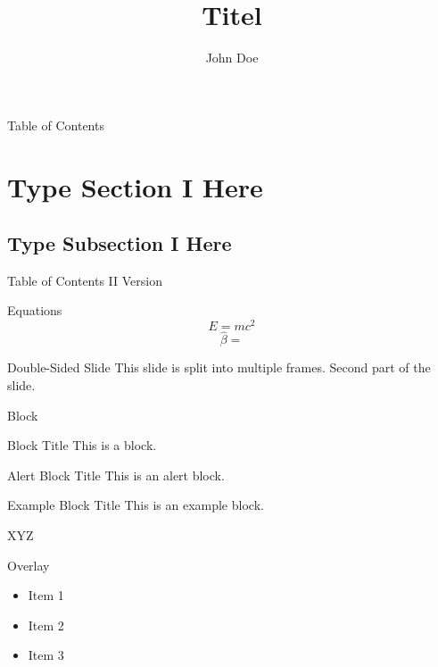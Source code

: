 \documentclass[11pt,aspectratio=169] {beamer}
\title[Short Title for Fooder]{Titel}							%
\author[Short Name for Fooder]{John Doe}
\institute[Short Name for Institute]{Institute}
\begin{document}
\begin{frame}
\titlepage
\end{frame}

\begin{frame}{Table of Contents}
\tableofcontents
\end{frame}
\section{Type Section I  Here}
\subsection{Type Subsection I Here}

\begin{frame}{Table of Contents II Version}
 \tableofcontents
    [
        currentsection,
        currentsubsection,
        subsectionstyle=show/shaded/hide
    ]
\end{frame}

\begin{frame}{Equations}
\[
E=mc^2
\]
\begin{equation}
\hat{\beta} = 
\end{equation}
\end{frame}

\begin{frame}[allowframebreaks]{Double-Sided Slide}
This slide is split into multiple frames.
\framebreak
Second part of the slide.
\end{frame}

\begin{frame}{Block}
\begin{block}{Block Title}
This is a block.
\end{block}
\begin{alertblock}{Alert Block Title}
This is an alert block.
\end{alertblock}
\begin{exampleblock}{Example Block Title}
This is an example block.
\end{exampleblock}
\end{frame}

\begin{frame}
\begin{Theorem}
XYZ 
\end{Theorem}
\end{frame}

\begin{frame}{Overlay}
\begin{itemize}
\item<1-> Item 1
\item<2-> Item 2
\item<3-> Item 3
\end{itemize}
\end{frame}
\end{document}
